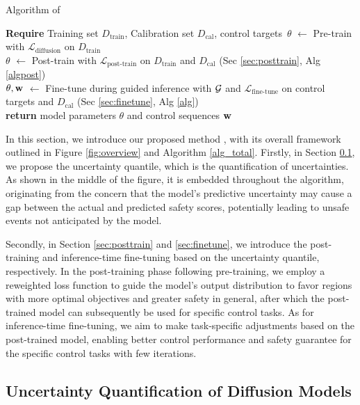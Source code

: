 \begin{algorithm}[ht]
    \small
    \caption{Algorithm of \proj}
    \label{alg_total}
    \begin{algorithmic}[1]
    \STATE \textbf{Require} Training set $D_{\textrm{train}}$, Calibration set $D_{\textrm{cal}}$, control targets\
    \STATE $\theta$ $\gets$ Pre-train with $\mathcal{L}_\textrm{diffusion}$ on $D_{\textrm{train}}$ \\
    \STATE $\theta$ $\gets$ Post-train with $\mathcal{L}_\textrm{post-train}$ on $D_{\textrm{train}}$ and $D_{\text{cal}}$ (Sec \ref{sec:posttrain}, Alg \ref{algpost}) \\
    \STATE $\theta, \mathbf{w}$ $\gets$ Fine-tune during guided inference with $\mathcal{G}$ and $\mathcal{L}_\textrm{fine-tune}$ on control targets and $D_{\textrm{cal}}$ (Sec \ref{sec:finetune}, Alg \ref{alg})
\hspace{0.8cm} \\
    \STATE \textbf{return} model parameters $\theta$ and control sequences $\mathbf{w}$
    \end{algorithmic}
\end{algorithm}

In this section, we introduce our proposed method \proj, with its overall framework outlined in Figure \ref{fig:overview} and Algorithm \ref{alg_total}. Firstly, in Section \ref{sec:conformal}, we propose the uncertainty quantile, which is the quantification of uncertainties. As shown in the middle of the figure, it is embedded throughout the algorithm, originating from the concern that the model's predictive uncertainty may cause a gap between the actual and predicted safety scores, potentially leading to unsafe events not anticipated by the model.

Secondly, in Section \ref{sec:posttrain} and \ref{sec:finetune}, we introduce the post-training and inference-time fine-tuning based on the uncertainty quantile, respectively. In the post-training phase following pre-training, we employ a reweighted loss function to guide the model's output distribution to favor regions with more optimal objectives and greater safety in general, after which the post-trained model can subsequently be used for specific control tasks. As for inference-time fine-tuning, we aim to make task-specific adjustments based on the post-trained model, enabling better control performance and safety guarantee for the specific control tasks with few iterations.

\subsection{Uncertainty Quantification of Diffusion Models}
\label{sec:conformal}

